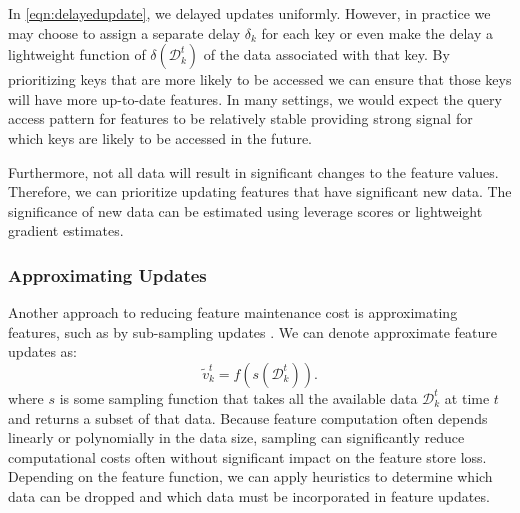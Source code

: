 In \cref{eqn:delayedupdate}, we delayed updates uniformly.  
However, in practice we may choose to assign a separate delay $\delta_k$ for each key or even make the delay a lightweight function of $\delta(\mathcal{D}^t_k)$ of the data associated with that key.
By prioritizing keys that are more likely to be accessed we can ensure that those keys will have more up-to-date features.
In many settings, we would expect the query access pattern for features to be relatively stable providing strong signal for which keys are likely to be accessed in the future.

Furthermore, not all data will result in significant changes to the feature values.  
Therefore, we can prioritize updating features that have significant new data.  
The significance of new data can be estimated using leverage scores\cite{} or lightweight gradient estimates. 




\subsubsection{Approximating Updates}

Another approach to reducing feature maintenance cost is approximating features, such as by sub-sampling updates \cite{wedge2018solving}. 
We can denote approximate feature updates as:
\begin{equation}
    \tilde{v}^t_k =  f\left( s(\mathcal{D}^{t}_k)\right).\label{eqn:sampling}
\end{equation}
where $s$ is some sampling function that takes all the available data $\mathcal{D}^{t}_k$ at time $t$ and returns a subset of that data.
Because feature computation often depends linearly or polynomially in the data size, sampling can significantly reduce computational costs often without significant impact on the feature store loss.
Depending on the feature function, we can apply heuristics to determine which data can be dropped and which data must be incorporated in feature updates.



